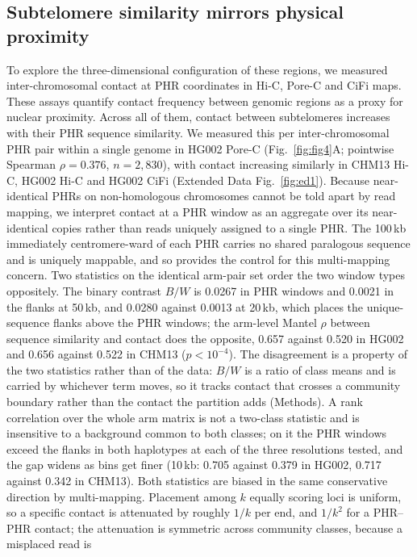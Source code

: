 \documentclass[pdflatex,mathphys]{jnl}
\begin{document}
\subsection*{Subtelomere similarity mirrors physical proximity}

To explore the three-dimensional configuration of these regions, we measured inter-chromosomal contact at PHR coordinates in Hi-C, Pore-C and CiFi maps. These assays quantify contact frequency between genomic regions as a proxy for nuclear proximity. Across all of them, contact between subtelomeres increases with their PHR sequence similarity.
We measured this per inter-chromosomal PHR pair within a single genome in
HG002 Pore-C (Fig.~\ref{fig:fig4}A; pointwise
Spearman $\rho = 0.376$, $n = 2{,}830$), with contact increasing similarly in
CHM13 Hi-C, HG002 Hi-C and HG002 CiFi (Extended Data Fig.~\ref{fig:ed1}).
Because near-identical PHRs on non-homologous chromosomes cannot be told apart by
read mapping, we interpret contact at a PHR window as an aggregate over its
near-identical copies rather than reads uniquely assigned to a single PHR.
The 100\,kb immediately centromere-ward of each PHR carries no shared paralogous
sequence and is uniquely mappable, and so provides the control for this
multi-mapping concern. Two statistics on the identical arm-pair set order the two
window types oppositely. The binary contrast $B/W$ is 0.0267 in PHR windows and
0.0021 in the flanks at 50\,kb, and 0.0280 against 0.0013 at 20\,kb, which places
the unique-sequence flanks above the PHR windows; the arm-level Mantel $\rho$
between sequence similarity and contact does the opposite, 0.657 against 0.520 in
HG002 and 0.656 against 0.522 in CHM13 ($p<10^{-4}$). The disagreement is a
property of the two statistics rather than of the data: $B/W$ is a ratio of class
means and is carried by whichever term moves, so it tracks contact that crosses a
community boundary rather than the contact the partition adds (Methods). A rank correlation over
the whole arm matrix is not a two-class statistic and is insensitive to a
background common to both classes; on it the PHR windows exceed the flanks in
both haplotypes at each of the three resolutions tested, and the gap widens as bins get
finer (10\,kb: 0.705 against 0.379 in HG002, 0.717 against 0.342 in CHM13).
Both statistics are biased in the same conservative direction by multi-mapping.
Placement among $k$ equally scoring loci is uniform, so a specific contact is
attenuated by roughly $1/k$ per end, and $1/k^2$ for a PHR--PHR contact; the
attenuation is symmetric across community classes, because a misplaced read is
\end{document}
